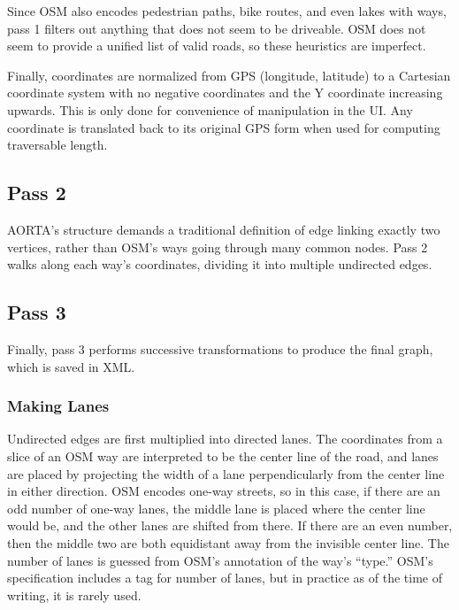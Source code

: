 \documentclass[letterpaper, 10 pt, conference]{ieeeconf}  %
\begin{document}
Since OSM also encodes pedestrian paths, bike routes, and even lakes with ways,
pass 1 filters out anything that does not seem to be driveable. OSM does not
seem to provide a unified list of valid roads, so these heuristics are
imperfect.

Finally, coordinates are normalized from GPS (longitude, latitude) to a
Cartesian coordinate system with no negative coordinates and the Y coordinate
increasing upwards. This is only done for convenience of manipulation in the UI.
Any coordinate is translated back to its original GPS form when used for
computing traversable length.

\subsection{Pass 2}

AORTA's structure demands a traditional definition of edge linking exactly two
vertices, rather than OSM's ways going through many common nodes. Pass 2 walks
along each way's coordinates, dividing it into multiple undirected edges.

\subsection{Pass 3}

Finally, pass 3 performs successive transformations to produce the final graph,
which is saved in XML.

\subsubsection{Making Lanes}


Undirected edges are first multiplied into directed lanes. The coordinates from
a slice of an OSM way are interpreted to be the center line of the road, and
lanes are placed by projecting the width of a lane perpendicularly from the
center line in either direction. OSM encodes one-way streets, so in this case,
if there are an odd number of one-way lanes, the middle lane is placed where the
center line would be, and the other lanes are shifted from there. If there are
an even number, then the middle two are both equidistant away from the invisible
center line. The number of lanes is guessed from OSM's annotation of the way's
``type.'' OSM's specification includes a tag for number of lanes, but in
practice as of the time of writing, it is rarely used.
\end{document}
